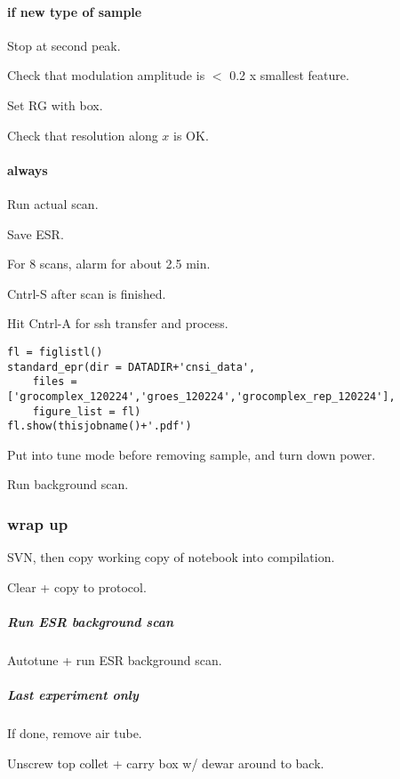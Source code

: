 \begin{scriptsize}
\begin{python}[off]

\paragraph{if new type of sample}
Stop at second peak.

Check that modulation amplitude is $<$ 0.2 x smallest feature.

Set RG with box.

Check that resolution along $x$ is OK.

\paragraph{always}

Run actual scan.

Save ESR.

For 8 scans, alarm for about 2.5 min.

Cntrl-S after scan is finished.

Hit Cntrl-A for ssh transfer and process.


\begin{tiny}
\begin{lstlisting}
fl = figlistl()
standard_epr(dir = DATADIR+'cnsi_data',
    files = ['grocomplex_120224','groes_120224','grocomplex_rep_120224'],
    figure_list = fl)
fl.show(thisjobname()+'.pdf')
\end{lstlisting}
\end{tiny}

Put into tune mode before removing sample, and turn down power.

Run background scan.

\subsubsection{wrap up}
SVN, then copy working copy of notebook into compilation.

Clear + copy to protocol.

\subparagraph{Run ESR background scan}
Autotune + run ESR background scan.

\subparagraph{Last experiment only}
If done, remove air tube.

Unscrew top collet + carry box w/ dewar around to back.


\end{python}
\end{scriptsize}
